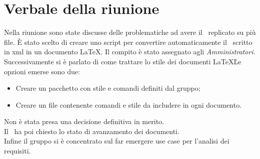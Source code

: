 \documentclass[../template.tex]{subfiles}
\newcommand{\amministratori}{\textit{Amministratori}}
\begin{document}
\section{Verbale della riunione}
Nella riunione sono state discusse delle problematiche ad avere il \glossario\ replicato su più file. È stato scelto di creare uno script per convertire automaticamente il \glossario\ scritto in xml in un documento \LaTeX. Il compito è stato assegnato agli \amministratori. \\
Successivamente si è parlato di come trattare lo stile dei documenti \LaTeX\. Le opzioni emerse sono due:
	\begin{itemize}
		\item Creare un pacchetto con stile e comandi definiti dal gruppo;
		\item Creare un file contenente comandi e stile da includere in ogni documento.
	\end{itemize}
Non è stata presa una decisione definitiva in merito.\\
Il \responsabilediprogetto\ ha poi chiesto lo stato di avanzamento dei documenti.\\
Infine il gruppo si è concentrato sul far emergere use case per l'analisi dei requisiti.
\end{document}
